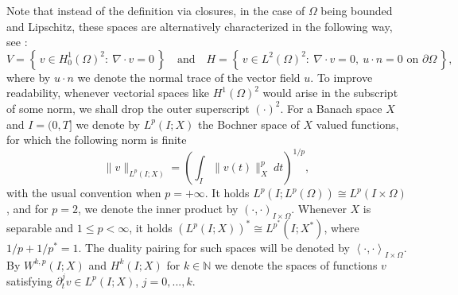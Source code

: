 \documentclass{m2an}
\newcommand{\N}{\mathbb{N}}
\newcommand{\IOprod}[1]{\left( #1 \right)_{I\times\Omega}}
\newcommand{\IOpair}[1]{\left\langle #1 \right\rangle_{I\times\Omega}}
\newcommand{\MathSet}[1]{\left\lbrace \, #1 \, \right\rbrace}
\begin{document}
Note that instead of the definition via closures, in the case of $\Omega$ being bounded and Lipschitz,
these spaces are alternatively characterized in the following way,
see \cite[Chapter 1, Theorems 1.4 \& 1.6]{Temam1977}:
\begin{equation*}
  V = \MathSet{ v \in H^1_0(\Omega)^2 : \ \nabla \cdot v = 0 }
  \quad \text{and} \quad
  H = \MathSet{ v \in L^2(\Omega)^2: \ \nabla \cdot v= 0, \ u\cdot n = 0 \text{ on } \partial \Omega },
\end{equation*}
where by $u \cdot n$ we denote the normal trace of the vector field $u$.
To improve readability, whenever vectorial spaces like $H^1(\Omega)^2$ would arise in the subscript of some
norm, we shall drop the outer superscript $(\cdot)^2$.
For a Banach space $X$ and $I = (0,T]$
we denote by $L^p(I;X)$ the Bochner space of $X$ valued functions, for which the following norm is finite
\begin{equation*}
  \|v\|_{L^p(I;X)} = \left( \int_I \|v(t)\|_X^p \ dt  \right)^{1/p},
\end{equation*}
with the usual convention when $p= + \infty$.
It holds $L^p(I;L^p(\Omega)) \cong L^p(I\times \Omega)$, and for $p=2$,
we denote the inner product by $\IOprod{\cdot , \cdot}$.
Whenever $X$ is separable and $1 \le p < \infty$, it holds $(L^p(I;X))^* \cong L^{p^*}(I;X^*)$,
where $1/p + 1/p^* = 1$. The duality pairing for such spaces will be denoted by 
$\IOpair{\cdot , \cdot}$.
By $W^{k,p}(I;X)$ and $H^k(I;X)$ for $k \in \N$ we denote the spaces of functions $v$ 
satisfying $\partial_t^j v \in L^p(I;X)$, $j=0,...,k$.
\end{document}
